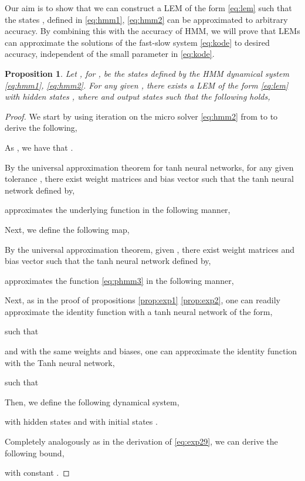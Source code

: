 \documentclass{article} \usepackage{iclr2022_conference,times}
\newtheorem{proposition}[theorem]{Proposition}
\begin{document}
Our aim is to show that we can construct a LEM of the form \eqref{eq:lem} such that the states , defined in \eqref{eq:hmm1}, \eqref{eq:hmm2} can be approximated to arbitrary accuracy. By combining this with the accuracy of HMM, we will prove that LEMs can approximate the solutions of the fast-slow system \eqref{eq:kode} to desired accuracy, independent of the small parameter  in \eqref{eq:kode}. 
\begin{proposition}
\label{prop:hmm}
Let , for , be the states defined by the HMM dynamical system \eqref{eq:hmm1}, \eqref{eq:hmm2}. For any given , there exists a LEM of the form \eqref{eq:lem} with hidden states , where  and output states  such that the following holds, 

\end{proposition}
\begin{proof}
We start by using iteration on the micro solver \eqref{eq:hmm2} from  to  to derive the following, 

As , we have that . 

By the universal approximation theorem for tanh neural networks, for any given tolerance , there exist weight matrices  and bias vector  such that the tanh neural network defined by,

approximates the underlying function  in the following manner, 


Next, we define the following map, 


By the universal approximation theorem, given 
, there exist weight matrices  and bias vector  such that the tanh neural network defined by,

approximates the function  \eqref{eq:phmm3} in the following manner, 


Next, as in the proof of propositions \ref{prop:exp1} \ref{prop:exp2}, one can readily approximate the identity function  with a tanh neural network of the form,

 such that

and with the same weights and biases, one can approximate the identity function  with the Tanh neural network,

 such that

Then, we define the following dynamical system, 

with hidden states  and with initial states .

Completely analogously as in the derivation of \eqref{eq:exp29}, we can derive the following bound,

with constant . 


\end{proof}
\end{document}
